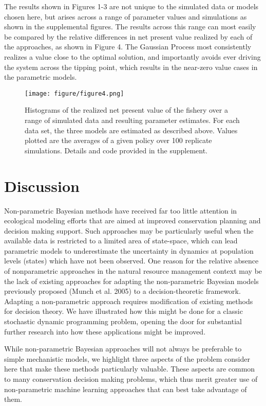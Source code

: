 \documentclass[author-year, review]{elsarticle} %
\makeatletter
\def\maxwidth{\ifdim\Gin@nat@width>\linewidth\linewidth
\else\Gin@nat@width\fi}
\let\Oldincludegraphics\includegraphics
\renewcommand{\includegraphics}[1]{\Oldincludegraphics[width=\maxwidth]{#1}}
\makeatother
\begin{document}
The results shown in Figures 1-3 are not unique to the simulated data or
models chosen here, but arises across a range of parameter values and
simulations as shown in the supplemental figures. The results across
this range can most easily be compared by the relative differences in
net present value realized by each of the approaches, as shown in Figure
4. The Gaussian Process most consistently realizes a value close to the
optimal solution, and importantly avoids ever driving the system across
the tipping point, which results in the near-zero value cases in the
parametric models.

\begin{figure}[htbp]
\centering
\texttt{[image: figure/figure4.png]}
\caption{Histograms of the realized net present value of the fishery
over a range of simulated data and resulting parameter estimates. For
each data set, the three models are estimated as described above. Values
plotted are the averages of a given policy over 100 replicate
simulations. Details and code provided in the supplement.}
\end{figure}

\section{Discussion}

Non-parametric Bayesian methods have received far too little attention
in ecological modeling efforts that are aimed at improved conservation
planning and decision making support. Such approaches may be
particularly useful when the available data is restricted to a limited
area of state-space, which can lead parametric models to underestimate
the uncertainty in dynamics at population levels (states) which have not
been observed. One reason for the relative absence of nonparametric
approaches in the natural resource management context may be the lack of
existing approaches for adapting the non-parametric Bayesian models
previously proposed (Munch et al. 2005) to a decision-theoretic
framework. Adapting a non-parametric approach requires modification of
existing methods for decision theory. We have illustrated how this might
be done for a classic stochastic dynamic programming problem, opening
the door for substantial further research into how these applications
might be improved.

While non-parametric Bayesian approaches will not always be preferable
to simple mechanistic models, we highlight three aspects of the problem
consider here that make these methods particularly valuable. These
aspects are common to many conservation decision making problems, which
thus merit greater use of non-parametric machine learning approaches
that can best take advantage of them.
\end{document}
